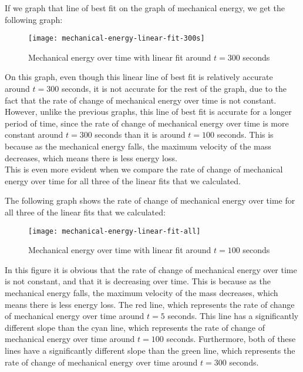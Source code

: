 \documentclass{article}
\begin{document}
            
            If we graph that line of best fit on the graph of mechanical energy, we get the following graph:
            
            \begin{figure}[H]
                \centering
                \texttt{[image: mechanical-energy-linear-fit-300s]}
                \caption{Mechanical energy over time with linear fit around $t=300$ seconds}
                \label{fig:mechanical-energy-linear-fit-300s}
            \end{figure}
            
            On this graph, even though this linear line of best fit is relatively accurate around $t=300$ seconds, it is not accurate for the rest of the graph, due to the fact that the rate of change of mechanical energy over time is not constant.
            However, unlike the previous graphs, this line of best fit is accurate for a longer period of time, since the rate of change of mechanical energy over time is more constant around $t=300$ seconds than it is around $t=100$ seconds.
            This is because as the mechanical energy falls, the maximum velocity of the mass decreases, which means there is less energy loss.\\
            \newline This is even more evident when we compare the rate of change of mechanical energy over time for all three of the linear fits that we calculated.
            
            
            The following graph shows the rate of change of mechanical energy over time for all three of the linear fits that we calculated:
            
            \begin{figure}[H]
                \centering
                \texttt{[image: mechanical-energy-linear-fit-all]}
                \caption{Mechanical energy over time with linear fit around $t=100$ seconds}
                \label{fig:mechanical-energy-linear-fit-all}
            \end{figure}
            
            In this figure it is obvious that the rate of change of mechanical energy over time is not constant, and that it is decreasing over time.
            This is because as the mechanical energy falls, the maximum velocity of the mass decreases, which means there is less energy loss.
            The red line, which represents the rate of change of mechanical energy over time around $t=5$ seconds.
            This line has a significantly different slope than the cyan line, which represents the rate of change of mechanical energy over time around $t=100$ seconds.
            Furthermore, both of these lines have a significantly different slope than the green line, which represents the rate of change of mechanical energy over time around $t=300$ seconds.\\
            
\end{document}
